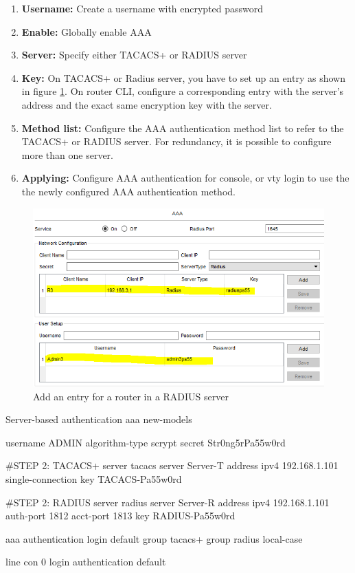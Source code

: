 \begin{enumerate}
\item \textbf{Username:} Create a username with encrypted password
\item \textbf{Enable:} Globally enable AAA
\item \textbf{Server:} Specify either TACACS+ or RADIUS server
\item \textbf{Key:} On TACACS+ or  Radius  server, you have to set up an entry as shown in figure \ref{RADIUSserver}. On router CLI, configure a corresponding entry with the server's address and the exact same encryption key with the server.
\item \textbf{Method list:} Configure the AAA authentication method list to refer to the TACACS+ or RADIUS server. For redundancy, it is possible to configure more than one server.
\item \textbf{Applying:} Configure AAA authentication for console, or vty login to use the the newly configured AAA authentication method.
\end{enumerate}

\begin{figure}[hbtp]
\caption{Add an entry for a router in a RADIUS server}\label{RADIUSserver}
\centering
\includegraphics[scale=0.5]{pictures/RADIUSserver.PNG}
\end{figure}


\begin{sexylisting}{Server-based authentication}
aaa new-models

username ADMIN algorithm-type scrypt secret Str0ng5rPa55w0rd

#STEP 2: TACACS+ server
tacacs server Server-T
  address ipv4 192.168.1.101
  single-connection
  key TACACS-Pa55w0rd

#STEP 2: RADIUS server 
radius server Server-R
  address ipv4 192.168.1.101 auth-port 1812 acct-port 1813
  key RADIUS-Pa55w0rd

aaa authentication login default group tacacs+ group radius local-case

line con 0
login authentication default 
\end{sexylisting}

